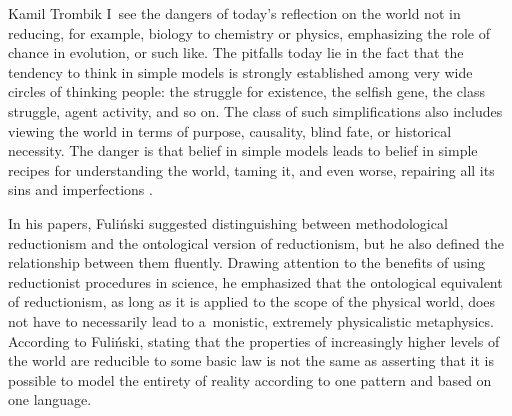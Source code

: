 \begin{artengenv}{Kamil Trombik}
I~see the dangers of today's reflection on the world not in reducing, for example, biology to chemistry or physics, emphasizing the role of chance in evolution, or such like. The pitfalls today lie in the fact that the tendency to think in simple models is strongly established among very wide circles of thinking people: the struggle for existence, the selfish gene, the class struggle, agent activity, and so on. The class of such simplifications also includes viewing the world in terms of purpose, causality, blind fate, or historical necessity. The danger is that belief in simple models leads to belief in simple recipes for understanding the world, taming it, and even worse, repairing all its sins and imperfections
\parencite[][p.230]{fulinski_maszyna_1989}.%




In his papers, Fuliński suggested distinguishing between methodological reductionism and the ontological version of reductionism, but he also defined the relationship between them fluently. Drawing attention to the benefits of using reductionist procedures in science, he emphasized that the ontological equivalent of reductionism, as long as it is applied to the scope of the physical world, does not have to necessarily lead to a~monistic, extremely physicalistic metaphysics. According to Fuliński, stating that the properties of increasingly higher levels of the world are reducible to some basic law is not the same as asserting that it is possible to model the entirety of reality according to one pattern and based on one language.




\end{artengenv}
